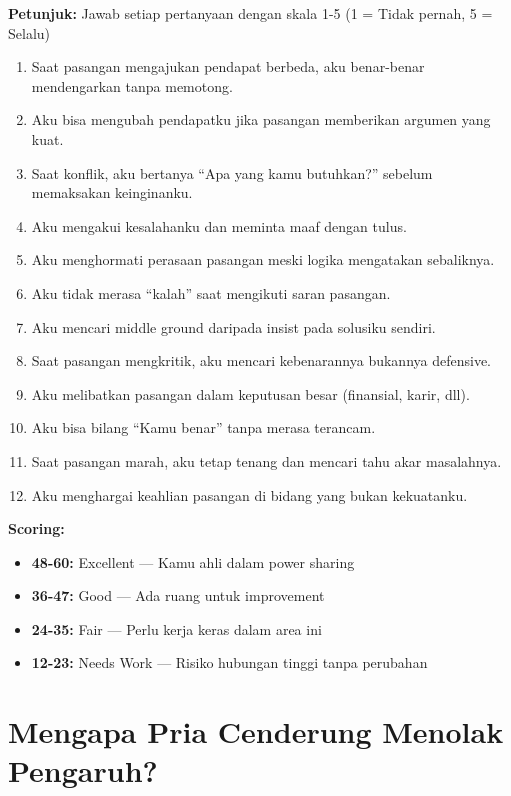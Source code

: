 \begin{exercisebox}
\textbf{Petunjuk:} Jawab setiap pertanyaan dengan skala 1-5 (1 = Tidak pernah, 5 = Selalu)

\begin{enumerate}[leftmargin=*]
    \item Saat pasangan mengajukan pendapat berbeda, aku benar-benar mendengarkan tanpa memotong.
    \item Aku bisa mengubah pendapatku jika pasangan memberikan argumen yang kuat.
    \item Saat konflik, aku bertanya ``Apa yang kamu butuhkan?'' sebelum memaksakan keinginanku.
    \item Aku mengakui kesalahanku dan meminta maaf dengan tulus.
    \item Aku menghormati perasaan pasangan meski logika mengatakan sebaliknya.
    \item Aku tidak merasa ``kalah'' saat mengikuti saran pasangan.
    \item Aku mencari middle ground daripada insist pada solusiku sendiri.
    \item Saat pasangan mengkritik, aku mencari kebenarannya bukannya defensive.
    \item Aku melibatkan pasangan dalam keputusan besar (finansial, karir, dll).
    \item Aku bisa bilang ``Kamu benar'' tanpa merasa terancam.
    \item Saat pasangan marah, aku tetap tenang dan mencari tahu akar masalahnya.
    \item Aku menghargai keahlian pasangan di bidang yang bukan kekuatanku.
\end{enumerate}

\textbf{Scoring:}
\begin{itemize}
    \item \textbf{48-60:} Excellent --- Kamu ahli dalam power sharing
    \item \textbf{36-47:} Good --- Ada ruang untuk improvement
    \item \textbf{24-35:} Fair --- Perlu kerja keras dalam area ini
    \item \textbf{12-23:} Needs Work --- Risiko hubungan tinggi tanpa perubahan
\end{itemize}
\end{exercisebox}

\section{Mengapa Pria Cenderung Menolak Pengaruh?}

